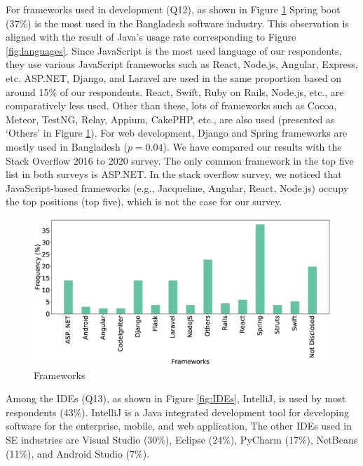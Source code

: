For frameworks used in development (Q12), as shown in Figure \ref{fig:frameworks} Spring boot (37\%) is the most used in the Bangladesh software industry. 
This observation is aligned with the result of Java's usage rate corresponding
to Figure \ref{fig:languages}. Since JavaScript is the most used language of our
respondents, they use various JavaScript frameworks such as React, Node.js,
Angular, Express, etc. ASP.NET, Django, and
Laravel are used in the same proportion based on around 15\% of our respondents.
React, Swift, Ruby on Rails, Node.js, etc., are comparatively less used. Other
than these, lots of frameworks such as Cocoa, Meteor, TestNG, Relay, Appium,
CakePHP, etc., are also used (presented as `Others' in Figure \ref{fig:frameworks}). For web development, Django
and Spring frameworks are mostly used in Bangladesh ($p=0.04$). We have compared
our results with the Stack Overflow 2016 to 2020
survey\cite{StackoverflowSurvey2017, StackoverflowSurvey2018,
StackoverflowSurvey2019, StackoverflowSurvey2020}. The only common framework in
the top five list in both surveys is ASP.NET. In the stack overflow survey, we
noticed that JavaScript-based frameworks (e.g., Jacqueline, Angular, React,
Node.js) occupy the top positions (top five), which is not the case for our
survey.

\begin{figure}[t]
\centering
  \includegraphics[scale=0.18]{Figures/Respondents_frameworks}
  \caption{Frameworks}
  \label{fig:frameworks}
\end{figure}

Among the IDEs (Q13), as shown in Figure \ref{fig:IDEs},
IntelliJ, is used by most respondents (43\%). IntelliJ is a Java integrated development tool for developing software for the
enterprise, mobile, and web application, The
other IDEs used in SE industries are Visual Studio (30\%), Eclipse (24\%),
PyCharm (17\%), NetBeans (11\%), and Android Studio (7\%).

